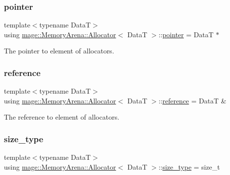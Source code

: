 \subsubsection{\texorpdfstring{pointer}{pointer}}
{\footnotesize\ttfamily template$<$typename DataT$>$ \\
using \hyperlink{structmage_1_1_memory_arena_1_1_allocator}{mage\+::\+Memory\+Arena\+::\+Allocator}$<$ DataT $>$\+::\hyperlink{structmage_1_1_memory_arena_1_1_allocator_a06c19054bb02d7e7c982434c47f19adf}{pointer} =  DataT $\ast$}

The pointer to element of allocators. \hypertarget{structmage_1_1_memory_arena_1_1_allocator_afeac56ef7ef38b63f56161988f59ef32}{}\label{structmage_1_1_memory_arena_1_1_allocator_afeac56ef7ef38b63f56161988f59ef32} 
\subsubsection{\texorpdfstring{reference}{reference}}
{\footnotesize\ttfamily template$<$typename DataT$>$ \\
using \hyperlink{structmage_1_1_memory_arena_1_1_allocator}{mage\+::\+Memory\+Arena\+::\+Allocator}$<$ DataT $>$\+::\hyperlink{structmage_1_1_memory_arena_1_1_allocator_afeac56ef7ef38b63f56161988f59ef32}{reference} =  DataT \&}

The reference to element of allocators. \hypertarget{structmage_1_1_memory_arena_1_1_allocator_ae9b21f77ba4d93a7c8f5ed3097bd6f8e}{}\label{structmage_1_1_memory_arena_1_1_allocator_ae9b21f77ba4d93a7c8f5ed3097bd6f8e} 
\subsubsection{\texorpdfstring{size\+\_\+type}{size\_type}}
{\footnotesize\ttfamily template$<$typename DataT$>$ \\
using \hyperlink{structmage_1_1_memory_arena_1_1_allocator}{mage\+::\+Memory\+Arena\+::\+Allocator}$<$ DataT $>$\+::\hyperlink{structmage_1_1_memory_arena_1_1_allocator_ae9b21f77ba4d93a7c8f5ed3097bd6f8e}{size\+\_\+type} =  size\+\_\+t}

